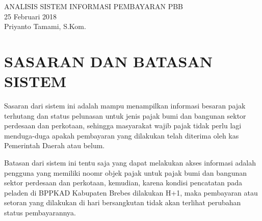\documentclass[pdftex,12pt, oneside]{article}
\begin{document}
\sloppy

%
\begin{center}
{\large ANALISIS SISTEM INFORMASI PEMBAYARAN PBB}
\\[1cm]
25 Februari 2018\\
Priyanto Tamami, S.Kom.
\end{center}


%
%

% 


%
%
%
%

%
%
%
% 
% 
% 

%
%


\section{SASARAN DAN BATASAN SISTEM}

Sasaran dari sistem ini adalah mampu menampilkan informasi besaran pajak terhutang dan status pelunasan untuk jenis pajak bumi dan bangunan sektor perdesaan dan perkotaan, sehingga masyarakat wajib pajak tidak perlu lagi menduga-duga apakah pembayaran yang dilakukan telah diterima oleh kas Pemerintah Daerah atau belum.

Batasan dari sistem ini tentu saja yang dapat melakukan akses informasi adalah pengguna yang memiliki noomr objek pajak untuk pajak bumi dan bangunan sektor perdesaan dan perkotaan, kemudian, karena kondisi pencatatan pada peladen di BPPKAD Kabupaten Brebes dilakukan H+1, maka pembayaran atau setoran yang dilakukan di hari bersangkutan tidak akan terlihat perubahan status pembayarannya.
\end{document}
